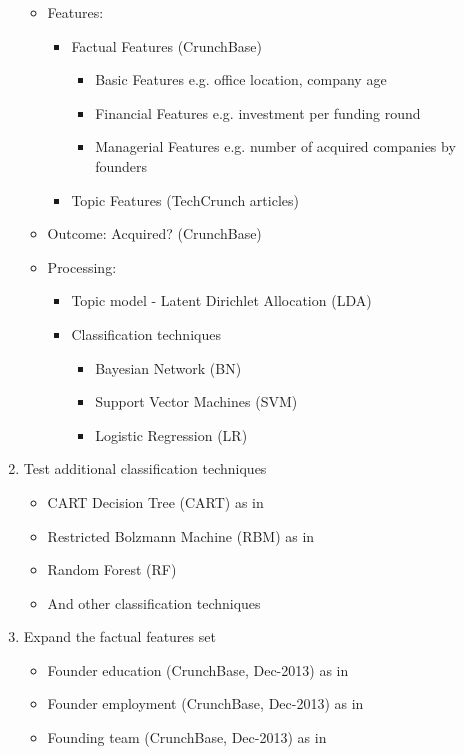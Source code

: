 \documentclass[12pt, a4paper]{article}
\begin{document}
\begin{enumerate}
\begin{itemize}
\item   Features:
\begin{itemize}
\item   Factual Features (CrunchBase)
\begin{itemize}
\item   Basic Features e.g. office location, company age
\item   Financial Features e.g. investment per funding round
\item   Managerial Features e.g. number of acquired companies by founders
\end{itemize}
\item   Topic Features (TechCrunch articles)
\end{itemize}
\item   Outcome: Acquired? (CrunchBase)
\item   Processing:
\begin{itemize}
\item   Topic model - Latent Dirichlet Allocation (LDA)
\item   Classification techniques
\begin{itemize}
\item   Bayesian Network (BN)
\item   Support Vector Machines (SVM)
\item   Logistic Regression (LR)
\end{itemize}
\end{itemize}
\end{itemize}
\item Test additional classification techniques
\begin{itemize}
\item   CART Decision Tree (CART) as in \cite{beckwith2016}
\item   Restricted Bolzmann Machine (RBM) as in \cite{beckwith2016}
\item   Random Forest (RF)
\item   And other classification techniques
\end{itemize}
\item Expand the factual features set
\begin{itemize}
\item   Founder education (CrunchBase, Dec-2013) as in \cite{beckwith2016}
\item   Founder employment (CrunchBase, Dec-2013) as in \cite{beckwith2016}
\item   Founding team (CrunchBase, Dec-2013) as in \cite{spiegel2013}

\end{itemize}
\end{enumerate}
\end{document}
